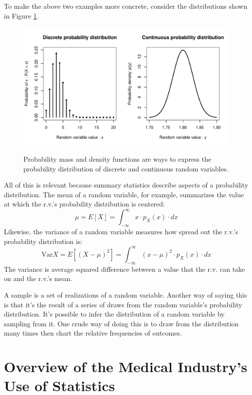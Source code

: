 \documentclass[11pt,a4paper,article]{memoir} %
\begin{document}
To make the above two examples more concrete, consider the distributions shown in Figure \ref{fig:example_pd}.
\begin{figure}
\includegraphics[width=\textwidth]{probability_distributions.pdf}
\label{fig:example_pd}
\caption{Probability mass and density functions are ways to express the probability distribution of discrete and continuous random variables.}
\end{figure}
 \par
All of this is relevant because summary statistics describe aspects of a probability distribution. The mean of a random variable, for example, summarizes the value at which the r.v.'s probability distribution is centered:
\[
	\mu = E[X] = \int_{-\infty}^{\infty}x\cdot p_X(x) \cdot dx
\]
Likewise, the variance of a random variable measures how spread out the r.v.'s probability distribution is:
\[
	\text{Var}X = E[(X - \mu)^2] = \int_{-\infty}^{\infty}(x - \mu)^2 \cdot p_X(x)\cdot dx
\]
The variance is average squared difference between a value that the r.v. can take on and the r.v.'s mean.
\par
A sample is a set of realizations of a random variable. Another way of saying this is that it's the result of a series of draws from the random variable's probability distribution. It's possible to infer the distribution of a random variable by sampling from it. One crude way of doing this is to draw from the distribution many times then chart the relative frequencies of outcomes. 


\newpage
\chapter{Overview of the Medical Industry's Use of Statistics}\label{industry_context} %
\end{document}
